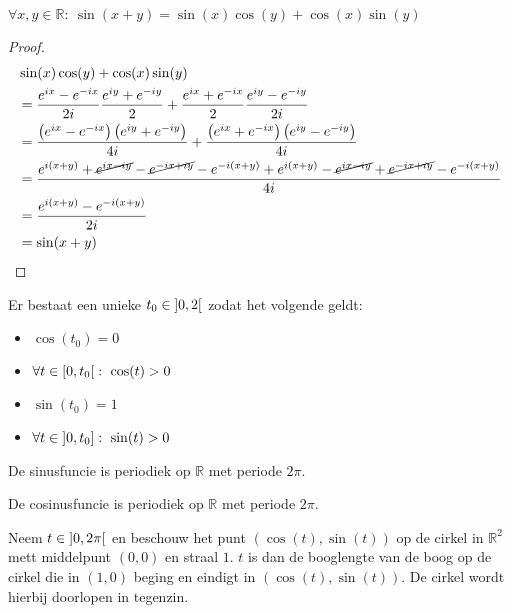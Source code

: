 \documentclass[main.tex]{subfiles}
\begin{document}
\begin{bpr}
  $\forall x,y\in \mathbb{R}:\ \sin(x+y) = \sin(x)\cos(y) + \cos(x)\sin(y)$

  \begin{proof}
    \begin{align*}
      &\sin(x)\cos(y) + \cos(x)\sin(y)\\
      &=\frac{e^{ix} - e^{-ix}}{2i}\frac{e^{iy} + e^{-iy}}{2} + \frac{e^{ix} + e^{-ix}}{2}\frac{e^{iy} - e^{-iy}}{2i}\\
      &= \frac{\left(e^{ix} - e^{-ix}\right)\left(e^{iy} + e^{-iy}\right)}{4i} + \frac{\left(e^{ix} + e^{-ix}\right)\left(e^{iy} - e^{-iy}\right)}{4i}\\
      &= \frac{e^{i(x+y)}+\cancel{e^{ix-iy}}-\cancel{e^{-ix+iy}}-e^{-i(x+y)} + e^{i(x+y)}-\cancel{e^{ix-iy}}+\cancel{e^{-ix+iy}}-e^{-i(x+y)}}{4i}\\
      &= \frac{e^{i(x+y)} - e^{-i(x+y)}}{2i}\\
      &= \sin(x+y)
    \end{align*}
  \end{proof}
\end{bpr}

\begin{bpr}
  Er bestaat een unieke $t_{0} \in \interval[open]{0}{2}$ zodat het volgende geldt:
  \begin{itemize}
  \item $\cos(t_{0}) = 0$
  \item $\forall t\in \interval[open right]{0}{t_{0}}:\ \cos(t) > 0$
  \item $\sin(t_{0})=1$
  \item $\forall t\in \interval[open left]{0}{t_{0}}:\ \sin(t)> 0$ 
  \end{itemize}
\end{bpr}

\begin{bpr}
  De sinusfuncie is periodiek op $\mathbb{R}$ met periode $2\pi$.
\end{bpr}

\begin{bpr}
  De cosinusfuncie is periodiek op $\mathbb{R}$ met periode $2\pi$.
\end{bpr}

\begin{bpr}
  Neem $t\in \interval[open]{0}{2\pi}$ en beschouw het punt $(\cos(t),\sin(t))$ op de cirkel in $\mathbb{R}^{2}$ mett middelpunt $(0,0)$ en straal $1$.
  $t$ is dan de booglengte van de boog op de cirkel die in $(1,0)$ beging en eindigt in $(\cos(t),\sin(t))$.
  De cirkel wordt hierbij doorlopen in tegenzin.
\end{bpr}
\end{document}
